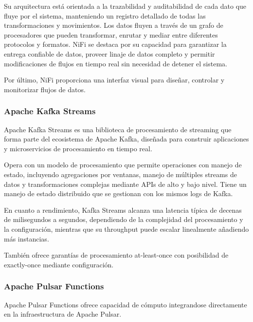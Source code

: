 Su arquitectura está orientada a la trazabilidad y auditabilidad de cada dato que fluye por el sistema, 
manteniendo un registro detallado de todas las transformaciones y movimientos. Los datos fluyen 
a través de un grafo de procesadores que pueden transformar, enrutar y mediar entre diferentes protocolos y formatos. 
NiFi se destaca por su capacidad para garantizar la entrega confiable de datos, proveer linaje de datos completo y 
permitir modificaciones de flujos en tiempo real sin necesidad de detener el sistema.\newline

Por último, NiFi proporciona una interfaz visual para diseñar, controlar y 
monitorizar flujos de datos.

\newpage
\subsubsection{Apache Kafka Streams}

Apache Kafka Streams es una biblioteca de procesamiento de streaming que forma parte del ecosistema de Apache Kafka, 
diseñada para construir aplicaciones y microservicios de procesamiento en tiempo real.\newline

Opera con un modelo de procesamiento que permite operaciones con manejo de estado, incluyendo agregaciones por ventanas, manejo de múltiples streams de datos 
y transformaciones complejas mediante APIs de alto y bajo nivel. Tiene un manejo de estado distribuido que se gestionan con los mismos logs de Kafka.\newline

En cuanto a rendimiento, Kafka Streams alcanza una latencia típica de decenas de milisegundos a segundos, dependiendo de la complejidad del procesamiento y la configuración, 
mientras que su throughput puede escalar linealmente añadiendo más instancias.\newline 

También ofrece garantías de procesamiento at-least-once con posibilidad de exactly-once mediante configuración.


\subsubsection{Apache Pulsar Functions}

Apache Pulsar Functions ofrece capacidad de cómputo integrandose directamente en la infraestructura de Apache Pulsar. \newline

